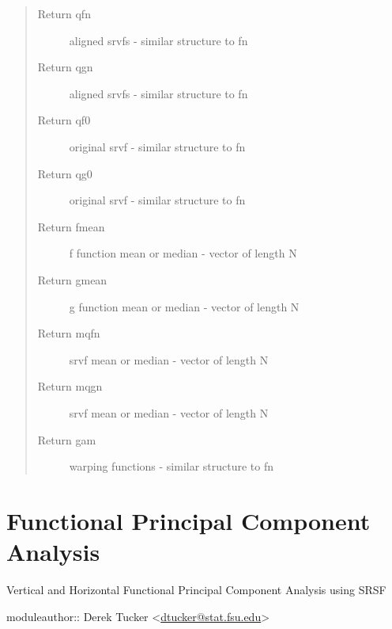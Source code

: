 \documentclass[letterpaper,10pt,english]{sphinxmanual}
\begin{document}
\begin{fulllineitems}
\begin{quote}
\begin{description}
\item[{Return qfn}] \leavevmode
aligned srvfs - similar structure to fn

\item[{Return qgn}] \leavevmode
aligned srvfs - similar structure to fn

\item[{Return qf0}] \leavevmode
original srvf - similar structure to fn

\item[{Return qg0}] \leavevmode
original srvf - similar structure to fn

\item[{Return fmean}] \leavevmode
f function mean or median - vector of length N

\item[{Return gmean}] \leavevmode
g function mean or median - vector of length N

\item[{Return mqfn}] \leavevmode
srvf mean or median - vector of length N

\item[{Return mqgn}] \leavevmode
srvf mean or median - vector of length N

\item[{Return gam}] \leavevmode
warping functions - similar structure to fn

\end{description}\end{quote}

\end{fulllineitems}



\chapter{Functional Principal Component Analysis}
\label{fPCA:module-fPCA}\label{fPCA:functional-principal-component-analysis}\label{fPCA::doc}
Vertical and Horizontal Functional Principal Component Analysis using SRSF

moduleauthor:: Derek Tucker \textless{}\href{mailto:dtucker@stat.fsu.edu}{dtucker@stat.fsu.edu}\textgreater{}
\end{document}
